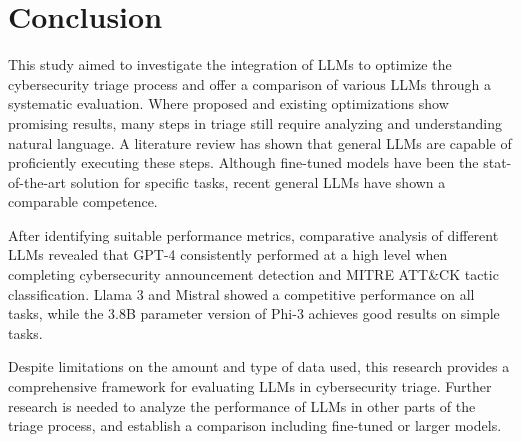\section{Conclusion}
\label{sec:conclusion}

This study aimed to investigate the integration of LLMs to optimize the cybersecurity triage process and offer a
comparison of various LLMs through a systematic evaluation.
Where proposed and existing optimizations show promising results, many steps in triage still require analyzing and
understanding natural language.
A literature review has shown that general LLMs are capable of proficiently executing these steps.
Although fine-tuned models have been the stat-of-the-art solution for specific tasks, recent general LLMs have shown a
comparable competence.

After identifying suitable performance metrics, comparative analysis of different LLMs revealed that GPT-4
consistently performed at a high level when completing cybersecurity announcement detection and MITRE ATT\&CK tactic
classification.
Llama 3 and Mistral showed a competitive performance on all tasks, while the 3.8B parameter version of Phi-3
achieves good results on simple tasks.

Despite limitations on the amount and type of data used, this research provides a comprehensive framework for
evaluating LLMs in cybersecurity triage.
Further research is needed to analyze the performance of LLMs in other parts of the triage process, and establish a
comparison including fine-tuned or larger models.
